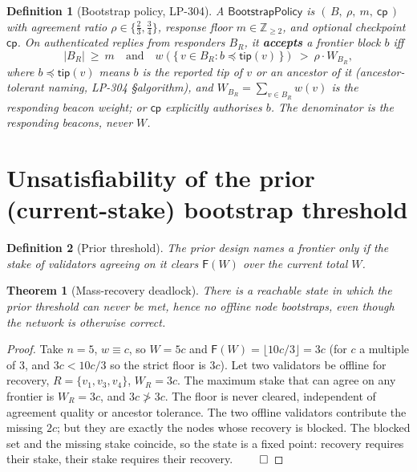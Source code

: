\documentclass[11pt]{article}
\newtheorem{theorem}{Theorem}
\newtheorem{definition}{Definition}
\begin{document}
\begin{definition}[Bootstrap policy, LP-304]\label{def:policy}
A $\mathsf{BootstrapPolicy}$ is $(\,B,\ \rho,\ m,\ \mathsf{cp}\,)$ with agreement ratio
$\rho\in\{\tfrac23,\tfrac34\}$, response floor $m\in\mathbb{Z}_{\ge 2}$, and optional
checkpoint $\mathsf{cp}$. On authenticated replies from responders $B_R$, it
\textbf{accepts} a frontier block $b$ iff
\[
   |B_R|\ \ge\ m \quad\text{and}\quad w\!\left(\{\,v\in B_R : b \preceq \mathsf{tip}(v)\,\}\right)\ >\ \rho\cdot W_{B_R},
\]
where $b\preceq \mathsf{tip}(v)$ means $b$ is the reported tip of $v$ or an ancestor of it
(ancestor-tolerant naming, LP-304 \S algorithm), and $W_{B_R}=\sum_{v\in B_R}w(v)$ is the
\emph{responding} beacon weight; or $\mathsf{cp}$ explicitly authorises $b$. The denominator
is the responding beacons, never $W$.
\end{definition}

\section{Unsatisfiability of the prior (current-stake) bootstrap threshold}

\begin{definition}[Prior threshold]
The prior design names a frontier only if the stake of validators agreeing on it clears
$\mathsf{F}(W)$ over the \emph{current total} $W$.
\end{definition}

\begin{theorem}[Mass-recovery deadlock]\label{thm:deadlock}
There is a reachable state in which the prior threshold can never be met, hence no offline
node bootstraps, even though the network is otherwise correct.
\end{theorem}

\begin{proof}
Take $n=5$, $w\equiv c$, so $W=5c$ and $\mathsf{F}(W)=\lfloor 10c/3\rfloor=3c$ (for $c$ a
multiple of $3$, and $3c<10c/3$ so the strict floor is $3c$). Let two validators be offline
for recovery, $R=\{v_1,v_3,v_4\}$, $W_R=3c$. The maximum stake that can agree on any frontier
is $W_R=3c$, and $3c \not> 3c$. The floor is never cleared, independent of agreement quality
or ancestor tolerance. The two offline validators contribute the missing $2c$; but they are
exactly the nodes whose recovery is blocked. The blocked set and the missing stake coincide,
so the state is a fixed point: recovery requires their stake, their stake requires their
recovery. $\qed$
\end{proof}
\end{document}
